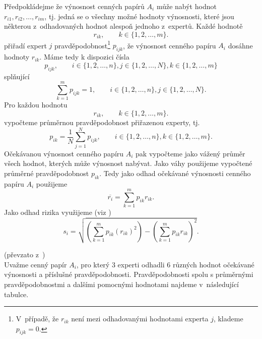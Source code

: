 \documentclass[12pt,a4paper]{report}
\begin{document}
Předpokládejme že výnosnost cenných papírů $A_i$ může nabýt hodnot $r_{i1},r_{i2},\dots,r_{im}$, tj. jedná se o všechny možné hodnoty výnosnosti, které jsou některou z~odhadovaných hodnot alespoň jednoho z~expertů. Každé hodnotě  
\[
r_{ik}, \qquad  k \in \{1,2,\dots,m\}.
\]
přiřadí expert $j$ pravděpodobnost\footnote{V~případě, že $r_{ik}$ není mezi odhadovanými hodnotami experta $j$, klademe $p_{ijk}=0$.} $p_{ijk}$, že výnosnost cenného papíru $A_i$ dosáhne hodnoty $r_{ik}$. Máme tedy k dispozici čísla
\[
p_{ijk}, \qquad  i \in \{1,2,\dots,n\}, j \in \{1,2,\dots,N\}, k \in \{1,2,\dots,m\}
\]
splňující
\[
\sum_{k=1}^m p_{ijk} = 1, \qquad  i \in \{1,2,\dots,n\}, j \in \{1,2,\dots,N\}.
\]
Pro každou hodnotu
\[
r_{ik}, \qquad  k \in \{1,2,\dots,m\}.
\]
vypočteme průměrnou pravděpodobnost přiřazenou experty, tj.
\[
p_{ik}=\frac{1}{N}\sum_{j=1}^N p_{ijk}, \qquad  i \in \{1,2,\dots,n\}, k \in \{1,2,\dots,m\}.
\]
Očekávanou výnosnost cenného papíru $A_i$ pak vypočteme jako vážený průměr všech hodnot, kterých může výnosnost nabývat. Jako váhy použijeme vypočtené průměrné pravděpodobnost $p_{ik}$. Tedy jako odhad očekávané výnosnosti cenného papíru $A_i$ použijeme
\[
\overline{r_i}=\sum_{k=1}^m p_{ik}r_{ik}.
\]
Jako odhad rizika využijeme (viz \cite{camsky})
\[
s_i=\sqrt{\left(\sum_{k=1}^m p_{ik}\left(r_{ik}\right)^2\right) - \left(\sum_{k=1}^m p_{ik}r_{ik}\right)^2}.
\]

\bigskip
{} (převzato z~\cite[str. 13]{camsky})\\[1ex]
Uvažme cenný papír $A_i$, pro který 3 experti odhadli 6 různých hodnot očekávané výnosnosti a příslušné pravděpodobnosti. Pravděpodobnosti spolu s průměrnými pravděpodobnostmi a dalšími pomocnými hodnotami najdeme v~následující tabulce.
\end{document}
